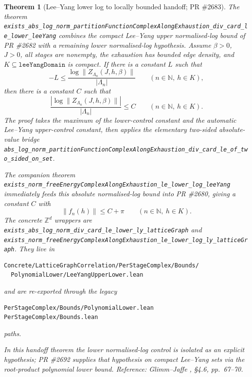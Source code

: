 \documentclass[a4paper,11pt]{article}
\newtheorem{theorem}{Theorem}
\begin{document}
\begin{theorem}[Lee--Yang lower log to locally bounded handoff; PR \#2683]
The theorem
\texttt{exists\_abs\_log\_norm\_partitionFunctionComplexAlongExhaustion\_div\_card\_le\_lower\_leeYang}
combines the compact Lee--Yang upper normalised-log bound of PR \#2682 with a
remaining lower normalised-log hypothesis.  Assume $\beta>0$, $J>0$, all
stages are nonempty, the exhaustion has bounded edge density, and
$K\subseteq\texttt{leeYangDomain}$ is compact.  If there is a constant $L$
such that
\[
  -L \le
  \frac{\log\|Z_{\Lambda_n}(J,h,\beta)\|}{|\Lambda_n|}
  \qquad(n\in\mathbb N,\ h\in K),
\]
then there is a constant $C$ such that
\[
  \frac{\left|\log\|Z_{\Lambda_n}(J,h,\beta)\|\right|}{|\Lambda_n|}
  \le C
  \qquad(n\in\mathbb N,\ h\in K).
\]
The proof takes the maximum of the lower-control constant and the automatic
Lee--Yang upper-control constant, then applies the elementary two-sided
absolute-value bridge
\texttt{abs\_log\_norm\_partitionFunctionComplexAlongExhaustion\_div\_card\_le\_of\_two\_sided\_on\_set}.

The companion theorem
\texttt{exists\_norm\_freeEnergyComplexAlongExhaustion\_le\_lower\_log\_leeYang}
immediately feeds this absolute normalised-log bound into PR \#2680, giving a
constant $C$ with
\[
  \|f_n(h)\|\le C+\pi
  \qquad(n\in\mathbb N,\ h\in K).
\]
The concrete $\mathbb Z^d$ wrappers are
\texttt{exists\_abs\_log\_norm\_div\_card\_le\_lower\_ly\_latticeGraph}
and
\texttt{exists\_norm\_freeEnergyComplexAlongExhaustion\_le\_lower\_log\_ly\_latticeGraph}.
They live in
\begin{Verbatim}[fontsize=\footnotesize]
Concrete/LatticeGraphCorrelation/PerStageComplex/Bounds/
  PolynomialLower/LeeYangUpperLower.lean
\end{Verbatim}
and are re-exported through the legacy
\begin{Verbatim}[fontsize=\footnotesize]
PerStageComplex/Bounds/PolynomialLower.lean
PerStageComplex/Bounds.lean
\end{Verbatim}
paths.

In this handoff theorem the lower normalised-log control is isolated as an
explicit hypothesis; PR \#2692 supplies that hypothesis on compact Lee--Yang
sets via the root-product polynomial lower bound.  Reference: Glimm--Jaffe
\cite{glimm-jaffe}, \S 4.6, pp.~67--70.
\end{theorem}
\end{document}
